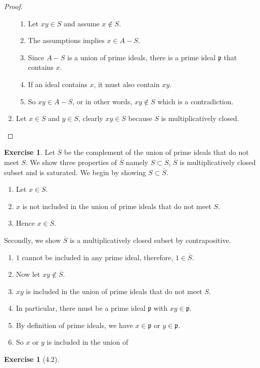 \documentclass{book}
\theoremstyle{plain}
\theoremstyle{definition}
\newtheorem{exr}[thm]{Exercise}
\theoremstyle{custom_definition}
\begin{document}
\begin{proof}
\begin{enumerate}
        \begin{enumerate}
            \item Let \(xy \in S\) and assume \(x \not\in S\).
            \item The assumptions implies \(x \in A - S\).
            \item Since \(A - S\) is a union of prime ideals, there is a prime ideal \(\mathfrak{p}\) that contains \(x\).
            \item If an ideal contains \(x\), it must also contain \(xy\).
            \item So \(xy \in A - S\), or in other words, \(xy \not\in S\) which is a contradiction.
        \end{enumerate}
        \item Let \(x \in S\) and \(y \in S\), clearly \(xy \in S\) because \(S\) is multiplicatively closed.
    \end{enumerate}
\end{proof}

\begin{exr}
    Let \(\overline{S}\) be the complement of the union of prime ideals that do not meet \(S\). We show three properties of \(\overline{S}\) namely \(S \subset \overline{S}\), \(\overline{S}\) is multiplicatively closed subset and is saturated.
%
    We begin by showing \(S \subset \overline{S}\).
    \begin{enumerate}
        \item Let \(x \in S\).
        \item \(x\) is not included in the union of prime ideals that do not meet \(S\).
        \item Hence \(x \in \overline{S}\).
    \end{enumerate}
    Secondly, we show \(\overline{S}\) is a multiplicatively closed subset by contrapositive.
    \begin{enumerate}
        \item \(1\) cannot be included in any prime ideal, therefore, \(1 \in \overline{S}\).
        \item Now let \(xy \not\in \overline{S}\).
        \item \(xy\) is included in the union of prime ideals that do not meet \(S\).
        \item In particular, there must be a prime ideal \(\mathfrak{p}\) with \(xy \in \mathfrak{p}\).
        \item By definition of prime ideals, we have \(x \in \mathfrak{p}\) or \(y \in \mathfrak{p}\).
        \item So \(x\) or \(y\) is included in the union of 
    \end{enumerate}
\end{exr}

\begin{exr}[4.2]
    
\end{exr}
\end{document}
